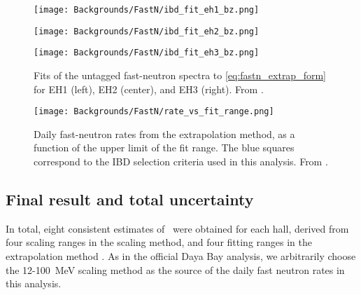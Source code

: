 \documentclass[../thesis.tex]{subfiles}
\begin{document}
\begin{figure}[ht]
  \begin{minipage}{0.333\textwidth}%
    \texttt{[image: Backgrounds/FastN/ibd\_fit\_eh1\_bz.png]}%
  \end{minipage}%
  \begin{minipage}{0.333\textwidth}%
    \texttt{[image: Backgrounds/FastN/ibd\_fit\_eh2\_bz.png]}%
  \end{minipage}%
  \begin{minipage}{0.333\textwidth}%
    \texttt{[image: Backgrounds/FastN/ibd\_fit\_eh3\_bz.png]}%
  \end{minipage}%
  \caption{Fits of the untagged fast-neutron spectra to \autoref{eq:fastn_extrap_form} for EH1 (left), EH2 (center), and EH3 (right). From \cite{fastn}.}
  \label{fig:fastn_ibd_fit_bz}
\end{figure}

\begin{figure}[h]
  \texttt{[image: Backgrounds/FastN/rate\_vs\_fit\_range.png]}
  \caption{Daily fast-neutron rates from the extrapolation method, as a function of the upper limit of the fit range. The blue squares correspond to the IBD selection criteria used in this analysis. From \cite{fastn}.}
  \label{fig:fastn_rate_vs_fit_range}
\end{figure}

\subsection{Final result and total uncertainty}
\label{sec:fastn_comb}

In total, eight consistent estimates of \rfn\ were obtained for each hall, derived from four scaling ranges in the scaling method, and four fitting ranges in the extrapolation method \cite{fastn}. As in the official Daya Bay analysis, we arbitrarily choose the 12-100~MeV scaling method as the source of the daily fast neutron rates in this analysis.
\end{document}
